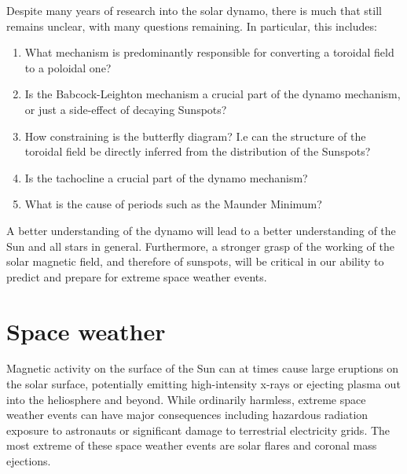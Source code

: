 \documentclass[11pt,a4paper,onecolumn]{report}
\begin{document}
Despite many years of research into the solar dynamo, there is much that still
remains unclear, with many questions remaining. In particular, this includes:
\begin{enumerate}
  \item What mechanism is predominantly responsible for converting a toroidal
  field to a poloidal one?

  \item Is the Babcock-Leighton mechanism a crucial part of the dynamo
  mechanism, or just a side-effect of decaying Sunspots?

  \item How constraining is the butterfly diagram? I.e can the structure of the toroidal field be
  directly inferred from the distribution of the Sunspots?

  \item Is the tachocline a crucial part of the dynamo mechanism?

  \item What is the cause of periods such as the Maunder Minimum?
\end{enumerate}
A better understanding of the dynamo will lead to a better understanding of the Sun
and all stars in general. Furthermore, a stronger grasp of the working of the
solar magnetic field, and therefore of sunspots, will be critical in our ability
to predict and prepare for extreme space weather events.








\section{Space weather}



Magnetic activity on the surface of the Sun can at times cause large eruptions
on the solar surface, potentially emitting high-intensity x-rays or ejecting
plasma out into the heliosphere and beyond. While ordinarily harmless, extreme
space weather events can have major consequences including hazardous radiation exposure
to astronauts or significant damage to terrestrial electricity grids. The most extreme
of these space weather events are solar flares and coronal mass ejections. \\
\end{document}
